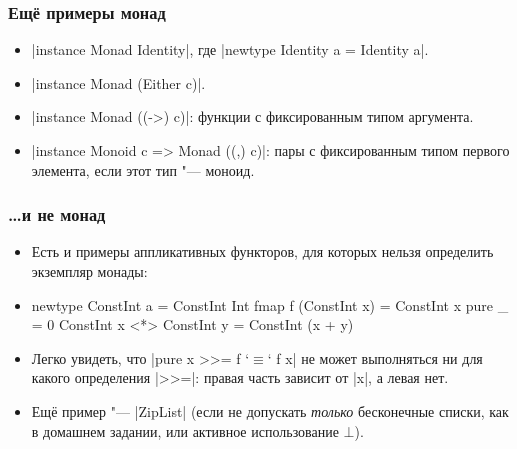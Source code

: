 \documentclass[11pt]{beamer}
\begin{document}
\begin{frame}[fragile]
  \frametitle{Ещё примеры монад}
  \begin{itemize}
    \item \haskinline|instance Monad Identity|, где \haskinline|newtype Identity a = Identity a|.
    \item \haskinline|instance Monad (Either c)|.
    \item \haskinline|instance Monad ((->) c)|: функции с фиксированным типом аргумента.
    \item \haskinline|instance Monoid c => Monad ((,) c)|: пары с фиксированным типом первого элемента, если этот тип "--- моноид.
  \end{itemize}
\end{frame}

\begin{frame}[fragile]
  \frametitle{\ldots и не монад}
  \begin{itemize}
    \item Есть и примеры аппликативных функторов, для которых нельзя определить экземпляр монады:
    \item
          \begin{haskell}
    newtype ConstInt a = ConstInt Int
    fmap f (ConstInt x) = ConstInt x
    pure _ = 0
    ConstInt x <*> ConstInt y = ConstInt (x + y)
    \end{haskell}
    \item Легко увидеть, что \haskinline|pure x >>= f `$\equiv$` f x| не может выполняться ни для какого определения \haskinline|>>=|: правая часть зависит от \haskinline|x|, а левая нет.
          \pause
    \item Ещё пример "--- \haskinline|ZipList| (если не допускать \emph{только} бесконечные списки, как в домашнем задании, или активное использование $\bot$).
  \end{itemize}
\end{frame}
\end{document}
